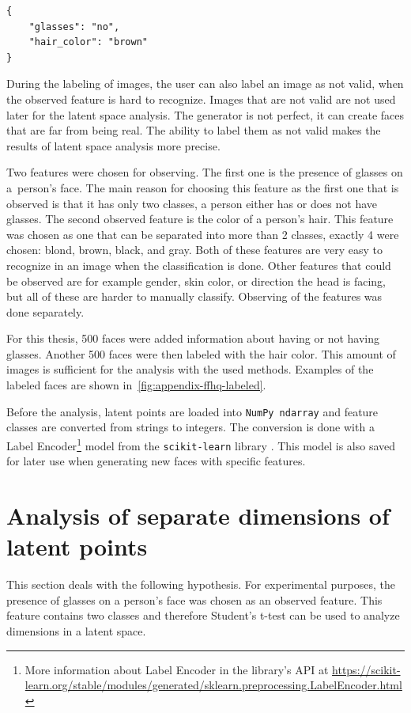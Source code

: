\begin{verbatim}
{
    "glasses": "no",
    "hair_color": "brown"
}
\end{verbatim}

During the labeling of images, the user can also label an image as not valid, when the observed feature is hard to recognize. Images that are not valid are not used later for the latent space analysis. The generator is not perfect, it can create faces that are far from being real. The ability to label them as not valid makes the results of latent space analysis more precise.

Two features were chosen for observing. The first one is the presence of glasses on a~person's face. The main reason for choosing this feature as the first one that is observed is that it has only two classes, a person either has or does not have glasses. The second observed feature is the color of a person's hair. This feature was chosen as one that can be separated into more than 2 classes, exactly 4 were chosen: blond, brown, black, and gray.  Both of these features are very easy to recognize in an image when the classification is done. Other features that could be observed are for example gender, skin color, or direction the head is facing, but all of these are harder to manually classify. Observing of the features was done separately.

For this thesis, 500 faces were added information about having or not having glasses. Another 500 faces were then labeled with the hair color. This amount of images is sufficient for the analysis with the used methods. Examples of the labeled faces are shown in~\autoref{fig:appendix-ffhq-labeled}.

Before the analysis, latent points are loaded into \texttt{NumPy ndarray} and feature classes are converted from strings to integers. The conversion is done with a Label Encoder\footnote{More information about Label Encoder in the library's API at \url{https://scikit-learn.org/stable/modules/generated/sklearn.preprocessing.LabelEncoder.html}} model from the \texttt{scikit-learn} library \cite{scikit-learn}. This model is also saved for later use when generating new faces with specific features.

\section{\label{sec:students-t-test}Analysis of separate dimensions of latent points}
This section deals with the following hypothesis.  For experimental purposes, the presence of glasses on a person's face was chosen as an observed feature. This feature contains two classes and therefore Student's t-test can be used to analyze dimensions in a latent space.

